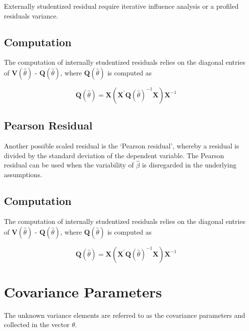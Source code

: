 \documentclass[Main.tex]{subfiles}
\begin{document}
	Externally  studentized residual require iterative influence analysis or a profiled residuals variance.
	

	\subsection{Computation}%
	
	The computation of internally studentized residuals relies on the diagonal entries of $\boldsymbol{V} (\hat{\theta})$ - $\boldsymbol{Q} (\hat{\theta})$, where $\boldsymbol{Q} (\hat{\theta})$ is computed as
	
	\[ \boldsymbol{Q} (\hat{\theta}) = \boldsymbol{X} ( \boldsymbol{X}^{\prime}\boldsymbol{Q} (\hat{\theta})^{-1}\boldsymbol{X})\boldsymbol{X}^{-1} \]
	
\subsection{Pearson Residual}%

Another possible scaled residual is the  `Pearson residual', whereby a residual is divided by the standard deviation of the dependent variable. The Pearson residual can be used when the variability of $\hat{\beta}$ is disregarded in the underlying assumptions.


\subsection{Computation}%

The computation of internally studentized residuals relies on the diagonal entries of $\boldsymbol{V} (\hat{\theta})$ - $\boldsymbol{Q} (\hat{\theta})$, where $\boldsymbol{Q} (\hat{\theta})$ is computed as

\[ \boldsymbol{Q} (\hat{\theta}) = \boldsymbol{X} ( \boldsymbol{X}^{\prime}\boldsymbol{Q} (\hat{\theta})^{-1}\boldsymbol{X})\boldsymbol{X}^{-1} \]



\section{Covariance Parameters} %
The unknown variance elements are referred to as the covariance parameters and collected in the vector $\theta$.
\end{document}
